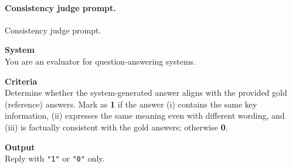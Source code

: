 \paragraph{Consistency judge prompt.}
\begin{promptbox}{Consistency judge prompt.}
{\fontsize{7pt}{8pt}\selectfont

\noindent\textbf{System}\\
You are an evaluator for question-answering systems.

\noindent\textbf{Criteria}\\
Determine whether the system-generated answer aligns with the provided gold (reference) answers. Mark as \textbf{1} if the answer (i) contains the same key information, (ii) expresses the same meaning even with different wording, and (iii) is factually consistent with the gold answers; otherwise \textbf{0}.

\noindent\textbf{Output}\\
Reply with \texttt{"1"} or \texttt{"0"} only.
}
\end{promptbox}

